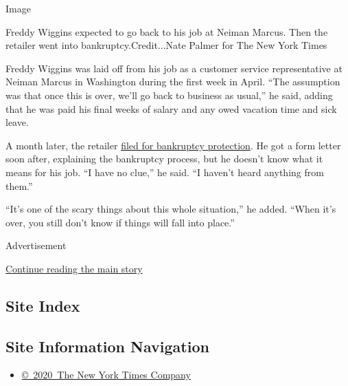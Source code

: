 Image

Freddy Wiggins expected to go back to his job at Neiman Marcus. Then the
retailer went into bankruptcy.Credit...Nate Palmer for The New York
Times

Freddy Wiggins was laid off from his job as a customer service
representative at Neiman Marcus in Washington during the first week in
April. ``The assumption was that once this is over, we'll go back to
business as usual,'' he said, adding that he was paid his final weeks of
salary and any owed vacation time and sick leave.

A month later, the retailer
\href{https://www.nytimes3xbfgragh.onion/2020/05/07/business/neiman-marcus-bankruptcy.html}{filed
for bankruptcy protection}. He got a form letter soon after, explaining
the bankruptcy process, but he doesn't know what it means for his job.
``I have no clue,'' he said. ``I haven't heard anything from them.''

``It's one of the scary things about this whole situation,'' he added.
``When it's over, you still don't know if things will fall into place.''

Advertisement

\protect\hyperlink{after-bottom}{Continue reading the main story}

\hypertarget{site-index}{%
\subsection{Site Index}\label{site-index}}

\hypertarget{site-information-navigation}{%
\subsection{Site Information
Navigation}\label{site-information-navigation}}

\begin{itemize}
\tightlist
\item
  \href{https://help.nytimes3xbfgragh.onion/hc/en-us/articles/115014792127-Copyright-notice}{©~2020~The
  New York Times Company}
\end{itemize}

